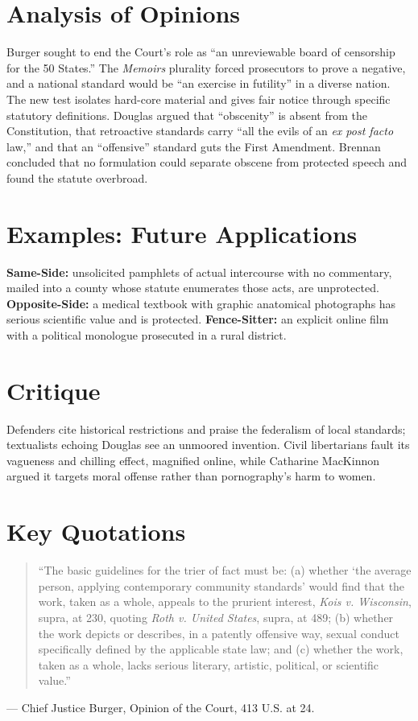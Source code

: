 \documentclass[12pt]{article}
\begin{document}
\section{Analysis of Opinions}
Burger sought to end the Court's role as ``an unreviewable board of censorship for the 50 States.'' The \textit{Memoirs} plurality forced prosecutors to prove a negative, and a national standard would be ``an exercise in futility'' in a diverse nation. The new test isolates hard-core material and gives fair notice through specific statutory definitions. Douglas argued that ``obscenity'' is absent from the Constitution, that retroactive standards carry ``all the evils of an \textit{ex post facto} law,'' and that an ``offensive'' standard guts the First Amendment. Brennan concluded that no formulation could separate obscene from protected speech and found the statute overbroad.

\section{Examples: Future Applications}
\textbf{Same-Side:} unsolicited pamphlets of actual intercourse with no commentary, mailed into a county whose statute enumerates those acts, are unprotected. \textbf{Opposite-Side:} a medical textbook with graphic anatomical photographs has serious scientific value and is protected. \textbf{Fence-Sitter:} an explicit online film with a political monologue prosecuted in a rural district.

\section{Critique}
Defenders cite historical restrictions and praise the federalism of local standards; textualists echoing Douglas see an unmoored invention. Civil libertarians fault its vagueness and chilling effect, magnified online, while Catharine MacKinnon argued it targets moral offense rather than pornography's harm to women.

\section{Key Quotations}
\begin{quote}
``The basic guidelines for the trier of fact must be: (a) whether `the average person, applying contemporary community standards' would find that the work, taken as a whole, appeals to the prurient interest, \textit{Kois v. Wisconsin}, supra, at 230, quoting \textit{Roth v. United States}, supra, at 489; (b) whether the work depicts or describes, in a patently offensive way, sexual conduct specifically defined by the applicable state law; and (c) whether the work, taken as a whole, lacks serious literary, artistic, political, or scientific value.''
\end{quote}
\noindent --- Chief Justice Burger, Opinion of the Court, 413 U.S. at 24.
\end{document}
